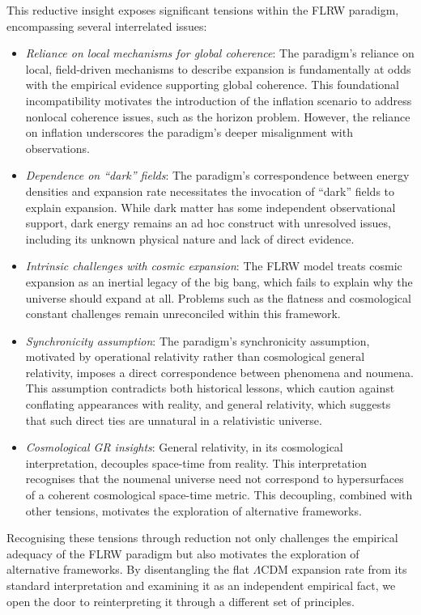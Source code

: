 \documentclass[aps,rmp,groupedaddress,twocolumn,10pt]{revtex4-2}
\begin{document}
This reductive insight exposes significant tensions within the FLRW paradigm, encompassing several interrelated issues:
\begin{itemize}
    \item[i.] \textit{Reliance on local mechanisms for global coherence}: The paradigm's reliance on local, field-driven mechanisms to describe expansion is fundamentally at odds with the empirical evidence supporting global coherence. This foundational incompatibility motivates the introduction of the inflation scenario to address nonlocal coherence issues, such as the horizon problem. However, the reliance on inflation underscores the paradigm's deeper misalignment with observations.
    \item[ii.] \textit{Dependence on ``dark'' fields}: The paradigm's correspondence between energy densities and expansion rate necessitates the invocation of ``dark'' fields to explain expansion. While dark matter has some independent observational support, dark energy remains an ad hoc construct with unresolved issues, including its unknown physical nature and lack of direct evidence.
    \item[iii.] \textit{Intrinsic challenges with cosmic expansion}: The FLRW model treats cosmic expansion as an inertial legacy of the big bang, which fails to explain why the universe should expand at all. Problems such as the flatness and cosmological constant challenges remain unreconciled within this framework.
    \item[iv.] \textit{Synchronicity assumption}: The paradigm's synchronicity assumption, motivated by operational relativity rather than cosmological general relativity, imposes a direct correspondence between phenomena and noumena. This assumption contradicts both historical lessons, which caution against conflating appearances with reality, and general relativity, which suggests that such direct ties are unnatural in a relativistic universe.
    \item[v.] \textit{Cosmological GR insights}: General relativity, in its cosmological interpretation, decouples space-time from reality. This interpretation recognises that the noumenal universe need not correspond to hypersurfaces of a coherent cosmological space-time metric. This decoupling, combined with other tensions, motivates the exploration of alternative frameworks.
\end{itemize}

Recognising these tensions through reduction not only challenges the empirical adequacy of the FLRW paradigm but also motivates the exploration of alternative frameworks. By disentangling the flat $\Lambda$CDM expansion rate from its standard interpretation and examining it as an independent empirical fact, we open the door to reinterpreting it through a different set of principles.
\end{document}
